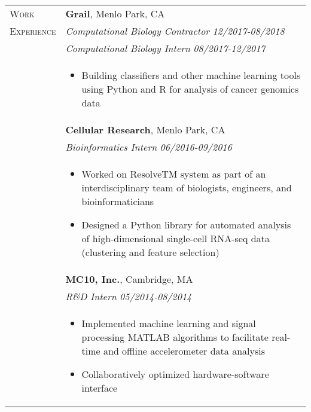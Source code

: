 \documentclass[letterpaper,11pt,oneside]{article}
\begin{document}
\begin{longtable}{@{} p{2.5cm} p{14.8cm}}
     
  \large{\textsc{Work}}  & \textbf{Grail}, Menlo Park, CA \\*
  \large{\textsc{Experience}}  & \textit{Computational Biology Contractor}  \hfill \textit{12/2017-08/2018} \\* 
  & \textit{Computational Biology Intern}   \hfill \textit{08/2017-12/2017} \\*
& 
\vspace{-7mm}
\begin{itemize}[leftmargin=.5cm]
	\setlength\itemsep{-0.3em}
	\item Building classifiers and other machine learning tools using Python and R for analysis of cancer genomics data
\end{itemize} 
\\

& \textbf{Cellular Research}, Menlo Park, CA \\*
& \textit{Bioinformatics Intern} \hfill \textit{06/2016-09/2016} \\* 
& 
\vspace{-7mm}
\begin{itemize}[leftmargin=.5cm]
	\setlength\itemsep{-0.3em}
	\item Worked on ResolveTM system as part of an interdisciplinary team of biologists, engineers, and bioinformaticians
	\item Designed a Python library for automated analysis of high-dimensional single-cell RNA-seq data (clustering and feature selection)
\end{itemize} 
\\


& \textbf{MC10, Inc.}, Cambridge, MA \\
& \textit{R\&D Intern} \hfill \textit{05/2014-08/2014} \\ 
& 
\vspace{-7mm}
\begin{itemize}[leftmargin=.5cm]
	\setlength\itemsep{-0.3em}
	\item Implemented machine learning and signal processing MATLAB algorithms to facilitate real-time and offline accelerometer data analysis
	\item Collaboratively optimized hardware-software interface
\end{itemize} 
\\


\end{longtable}
\end{document}
